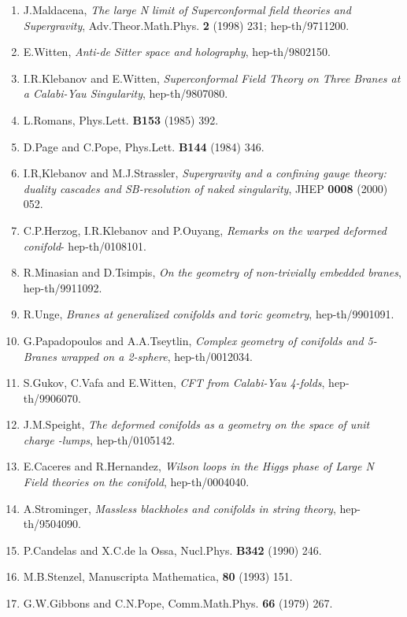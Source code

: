 \documentclass[a4paper,12pt]{article}
\begin{document}
{\begin{enumerate}
\item J.Maldacena, {\it{The large N limit of Superconformal field theories 
                   and Supergravity}}, Adv.Theor.Math.Phys. {\bf{2}} (1998)
                   231; hep-th/9711200.  
\item E.Witten, {\it{Anti-de Sitter space and holography}}, hep-th/9802150.  
\item I.R.Klebanov and E.Witten, {\it{Superconformal Field Theory on Three 
                   Branes at a Calabi-Yau Singularity}}, hep-th/9807080. 
\item L.Romans, Phys.Lett. {\bf{B153}} (1985) 392. 
\item D.Page and C.Pope, Phys.Lett. {\bf{B144}} (1984) 346.  
\item I.R,Klebanov and M.J.Strassler, {\it{Supergravity and a confining 
                  gauge theory: duality cascades and \myHighlight{$\chi$}\coordHE{}SB-resolution of 
                  naked singularity}}, JHEP {\bf{0008}} (2000) 052. 
\item C.P.Herzog, I.R.Klebanov and P.Ouyang, {\it{Remarks on the warped 
                  deformed conifold}}- hep-th/0108101.
\item R.Minasian and D.Tsimpis, {\it{On the geometry of non-trivially 
                  embedded branes}}, hep-th/9911092.
\item R.Unge, {\it{Branes at generalized conifolds and toric geometry}}, 
               hep-th/9901091.
\item G.Papadopoulos and A.A.Tseytlin, {\it{Complex geometry of conifolds 
                 and 5-Branes wrapped on a 2-sphere}}, hep-th/0012034.
\item S.Gukov, C.Vafa and E.Witten, {\it{CFT from Calabi-Yau 4-folds}}, 
               hep-th/9906070.
\item J.M.Speight, {\it{The deformed conifolds as a geometry on the space 
                of unit charge \coordHE{}-lumps}}, hep-th/0105142.
\item E.Caceres and R.Hernandez, {\it{Wilson loops in the Higgs phase of 
               Large N Field theories on the conifold}}, hep-th/0004040.
\item A.Strominger, {\it{Massless blackholes and conifolds in string theory}},
               hep-th/9504090.
\item P.Candelas and X.C.de la Ossa, Nucl.Phys. {\bf{B342}} (1990) 246.
\item M.B.Stenzel, Manuscripta Mathematica, {\bf{80}} (1993) 151.
\item G.W.Gibbons and C.N.Pope, Comm.Math.Phys. {\bf{66}} (1979) 267.

\end{enumerate}}
\end{document}
